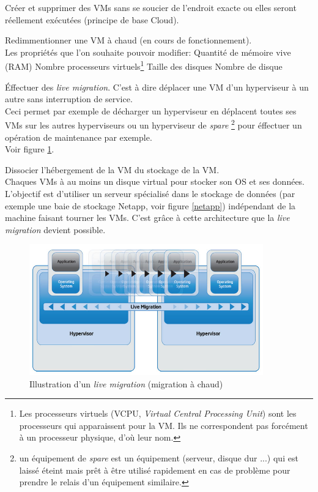 \begin{listi}
	\item Créer et supprimer des VMs sans se soucier de l'endroit exacte ou elles seront réellement exécutées (principe de base Cloud).
	\item Redimmentionner une VM à chaud (en cours de fonctionnement).\\
		Les propriétés que l'on souhaite pouvoir modifier:
		\subitem Quantité de mémoire vive (RAM)
		\subitem Nombre processeurs virtuels\footnote{Les processeurs virtuels (VCPU, \emph{Virtual Central Processing Unit}) sont les processeurs qui apparaissent
			pour la VM. Ils ne correspondent pas forcément à un processeur physique, d'où leur nom.}
		\subitem Taille des disques
		\subitem Nombre de disque
	\item Éffectuer des \emph{live migration}. C'est à dire déplacer une VM d'un hyperviseur à un autre sans interruption de service.\\
		Ceci permet par exemple de décharger un hyperviseur en déplacent toutes ses VMs sur les autres hyperviseurs ou un hyperviseur de \emph{spare}
		\footnote{un équipement de \emph{spare} est un équipement (serveur, disque dur ...) qui est laissé éteint mais prêt à être utilisé rapidement
		en cas de problème pour prendre le relais d'un équipement similaire.} pour éffectuer un opération de maintenance par exemple.
		\\
		Voir figure \ref{livemigration}.
	\item Dissocier l'hébergement de la VM du stockage de la VM.\\
		Chaques VMs à au moins un disque virtual pour stocker son OS et ses données. L'objectif est d'utiliser un serveur spécialisé dans le stockage de données
		(par exemple une baie de stockage Netapp, voir figure \ref{netapp}) indépendant de la machine faisant tourner les VMs. C'est grâce à cette architecture que
		la \emph{live migration} devient possible.
\end{listi}

\begin{figure}[h]
\centering
\includegraphics[width=0.9\textwidth]{resource/img/live-migration}
\caption{Illustration d'un \emph{live migration} (migration à chaud)}
\label{livemigration}
\end{figure}


